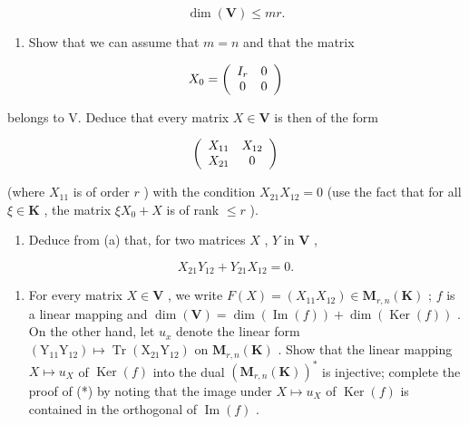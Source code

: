 \[
\dim (\mathbf {V}) \leqslant m r.\tag{*}
\]

\begin{enumerate}
\def\labelenumi{(\alph{enumi})}
\tightlist
\item
  Show that we can assume that \(m = n\) and that the matrix
\end{enumerate}

\[
X _ {0} = \left( \begin{array}{c c} I _ {r} & 0 \\ 0 & 0 \end{array} \right)
\]

belongs to V. Deduce that every matrix \(X \in \mathbf{V}\) is then of the form

\[
\left( \begin{array}{c c} X _ {1 1} & X _ {1 2} \\ X _ {2 1} & 0 \end{array} \right)
\]

(where \(X_{11}\) is of order \(r\) ) with the condition \(X_{21}X_{12} = 0\) (use the fact that for all \(\xi \in \mathbf{K}\) , the matrix \(\xi X_0 + X\) is of rank \(\leqslant r\) ).

\begin{enumerate}
\def\labelenumi{(\alph{enumi})}
\setcounter{enumi}{1}
\tightlist
\item
  Deduce from (a) that, for two matrices \(X\) , \(Y\) in \(\mathbf{V}\) ,
\end{enumerate}

\[
X _ {2 1} Y _ {1 2} + Y _ {2 1} X _ {1 2} = 0.
\]

\begin{enumerate}
\def\labelenumi{(\alph{enumi})}
\setcounter{enumi}{2}
\tightlist
\item
  For every matrix \(X \in \mathbf{V}\) , we write \(F(X) = (X_{11}X_{12}) \in \mathbf{M}_{r,n}(\mathbf{K})\) ; \(f\) is a linear mapping and \(\dim(\mathbf{V}) = \dim(\operatorname{Im}(f)) + \dim(\operatorname{Ker}(f))\) . On the other hand, let \(u_x\) denote the linear form \((\mathrm{Y}_{11}\mathrm{Y}_{12}) \mapsto \operatorname{Tr}(\mathrm{X}_{21}\mathrm{Y}_{12})\) on \(\mathbf{M}_{r,n}(\mathbf{K})\) . Show that the linear mapping \(X \mapsto u_X\) of \(\operatorname{Ker}(f)\) into the dual \((\mathbf{M}_{r,n}(\mathbf{K}))^*\) is injective; complete the proof of (*) by noting that the image under \(X \mapsto u_X\) of \(\operatorname{Ker}(f)\) is contained in the orthogonal of \(\operatorname{Im}(f)\) .
\end{enumerate}

